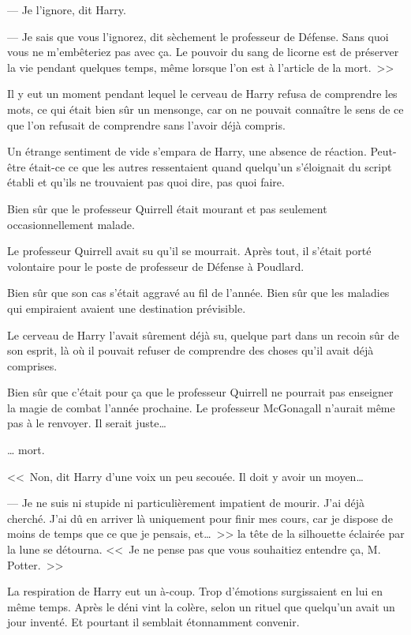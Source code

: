 --- Je l'ignore, dit Harry.

--- Je sais que vous l'ignorez, dit sèchement le professeur de Défense. Sans quoi vous ne m'embêteriez pas avec ça. Le pouvoir du sang de licorne est de préserver la vie pendant quelques temps, même lorsque l'on est à l'article de la mort.~>>

Il y eut un moment pendant lequel le cerveau de Harry refusa de comprendre les mots, ce qui était bien sûr un mensonge, car on ne pouvait connaître le sens de ce que l'on refusait de comprendre sans l'avoir déjà compris.

Un étrange sentiment de vide s'empara de Harry, une absence de réaction. Peut-être était-ce ce que les autres ressentaient quand quelqu'un s'éloignait du script établi et qu'ils ne trouvaient pas quoi dire, pas quoi faire.

Bien sûr que le professeur Quirrell était mourant et pas seulement occasionnellement malade.

Le professeur Quirrell avait su qu'il se mourrait. Après tout, il s'était porté volontaire pour le poste de professeur de Défense à Poudlard.

Bien sûr que son cas s'était aggravé au fil de l'année. Bien sûr que les maladies qui empiraient avaient une destination prévisible.

Le cerveau de Harry l'avait sûrement déjà su, quelque part dans un recoin sûr de son esprit, là où il pouvait refuser de comprendre des choses qu'il avait déjà comprises.

Bien sûr que c'était pour ça que le professeur Quirrell ne pourrait pas enseigner la magie de combat l'année prochaine. Le professeur McGonagall n'aurait même pas à le renvoyer. Il serait juste…

… mort.

<<~Non, dit Harry d'une voix un peu secouée. Il doit y avoir un moyen…

--- Je ne suis ni stupide ni particulièrement impatient de mourir. J'ai déjà cherché. J'ai dû en arriver là uniquement pour finir mes cours, car je dispose de moins de temps que ce que je pensais, et…~>> la tête de la silhouette éclairée par la lune se détourna. <<~Je ne pense pas que vous souhaitiez entendre ça, M. Potter.~>>

La respiration de Harry eut un à-coup. Trop d'émotions surgissaient en lui en même temps. Après le déni vint la colère, selon un rituel que quelqu'un avait un jour inventé. Et pourtant il semblait étonnamment convenir.

